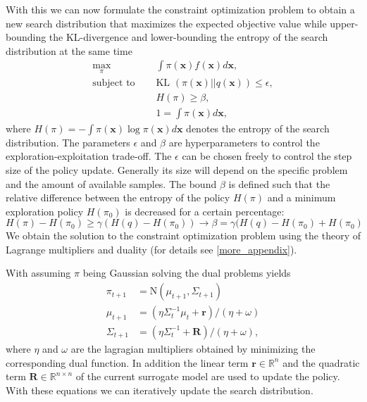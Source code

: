 With this we can now formulate the constraint optimization
problem to obtain a new search
distribution that maximizes the expected objective value
while upper-bounding the KL-divergence and lower-bounding the entropy
of the search distribution at the same time
\begin{equation*}
  \begin{aligned}
    \max_{\pi} \quad &\int \pi(\mathbf{x}) f(\mathbf{x}) d\mathbf{x}, \\
    \text{subject to } \quad &\text{KL }(\pi(\mathbf{x})||q(\mathbf{x})) \leq \epsilon, \\
     &H(\pi) \geq \beta, \\
     &1 = \int \pi(\mathbf{x}) d\mathbf{x},
  \end{aligned}
\end{equation*}
where $H(\pi) = - \int \pi(\mathbf{x}) \log \pi(\mathbf{x}) d\mathbf{x}$ denotes
the entropy of the search distribution.
The parameters $\epsilon$ and $\beta$ are hyperparameters to control the
exploration-exploitation trade-off.
The $\epsilon$ can be chosen freely to control the step size of the
policy update. Generally its size will depend on the specific problem
and the amount of available samples.
The bound $\beta$ is defined such that the relative difference
between the entropy
of the policy $H(\pi)$ and a minimum exploration policy $H(\pi_0)$ is
decreased
for a certain percentage:
$$ H(\pi) - H(\pi_0) \geq \gamma (H(q) - H(\pi_0))
\rightarrow \beta = \gamma (H(q) - H(\pi_0) + H(\pi_0) $$
We obtain the solution to the constraint optimization
problem using the theory of Lagrange multipliers and duality
(for details see \cref{more_appendix}).


With assuming $\pi$ being Gaussian solving the dual problems yields
\begin{equation}
  \label{policy_update}
  \begin{aligned}
    \pi_{t+1} &= \text{N}(\mu_{t+1}, \Sigma_{t+1}) \\
    \mu_{t+1} &= (\eta \Sigma_{t}^{-1}\mu_t + \mathbf{r}) / (\eta + \omega) \\
    \Sigma_{t+1} &= (\eta \Sigma_t^{-1} + \mathbf{R}) / (\eta + \omega),
  \end{aligned}
\end{equation}
where $\eta$ and $\omega$ are the lagragian multipliers obtained by minimizing
the corresponding dual function. In addition
the linear term  $\mathbf{r} \in \mathbb{R}^n$ and
the quadratic term $\mathbf{R} \in \mathbb{R}^{n\times n}$  of the current surrogate model are
used to update the policy.
With these equations we can iteratively update the search distribution.

